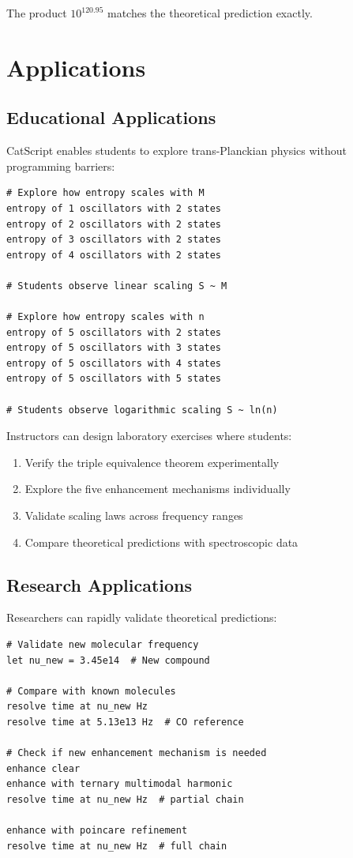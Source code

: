 \documentclass[twocolumn,10pt]{article}
\begin{document}
The product $10^{120.95}$ matches the theoretical prediction exactly.

\section{Applications}
\label{sec:applications}

\subsection{Educational Applications}

CatScript enables students to explore trans-Planckian physics without programming barriers:

\begin{lstlisting}[caption={Educational exploration}]
# Explore how entropy scales with M
entropy of 1 oscillators with 2 states
entropy of 2 oscillators with 2 states
entropy of 3 oscillators with 2 states
entropy of 4 oscillators with 2 states

# Students observe linear scaling S ~ M

# Explore how entropy scales with n
entropy of 5 oscillators with 2 states
entropy of 5 oscillators with 3 states
entropy of 5 oscillators with 4 states
entropy of 5 oscillators with 5 states

# Students observe logarithmic scaling S ~ ln(n)
\end{lstlisting}

Instructors can design laboratory exercises where students:
\begin{enumerate}
    \item Verify the triple equivalence theorem experimentally
    \item Explore the five enhancement mechanisms individually
    \item Validate scaling laws across frequency ranges
    \item Compare theoretical predictions with spectroscopic data
\end{enumerate}

\subsection{Research Applications}

Researchers can rapidly validate theoretical predictions:

\begin{lstlisting}[caption={Research validation workflow}]
# Validate new molecular frequency
let nu_new = 3.45e14  # New compound

# Compare with known molecules
resolve time at nu_new Hz
resolve time at 5.13e13 Hz  # CO reference

# Check if new enhancement mechanism is needed
enhance clear
enhance with ternary multimodal harmonic
resolve time at nu_new Hz  # partial chain

enhance with poincare refinement
resolve time at nu_new Hz  # full chain
\end{lstlisting}
\end{document}
